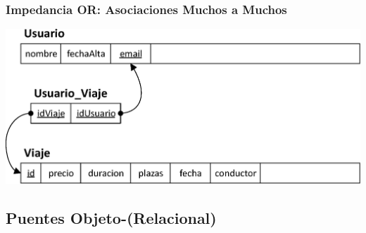 \documentclass[a4paper,slidestop,xcolor=pst,blue]{beamer}
\begin{document}
\begin{frame}[c]
    \frametitle{Impedancia OR: Asociaciones Muchos a Muchos}
    \begin{center}
        \includegraphics[width=0.8\linewidth]{images/ooMismatch/ooMismatch08.eps}
    \end{center}
\end{frame}

\subsection{Puentes Objeto-(Relacional)}
\end{document}

